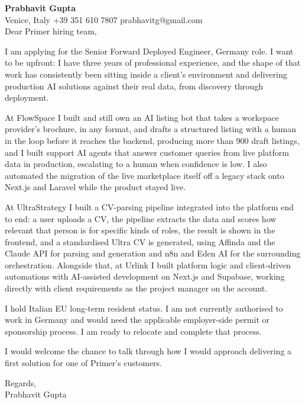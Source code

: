 \documentclass[a4paper,10.5pt]{article}
\begin{document}
\textbf{Prabhavit Gupta}\\
Venice, Italy \textbar{} +39 351 610 7807 \textbar{} prabhavitg@gmail.com\\[10pt]
Dear Primer hiring team,

I am applying for the Senior Forward Deployed Engineer, Germany role. I want to be upfront: I have three years of professional experience, and the shape of that work has consistently been sitting inside a client's environment and delivering production AI solutions against their real data, from discovery through deployment.

At FlowSpace I built and still own an AI listing bot that takes a workspace provider's brochure, in any format, and drafts a structured listing with a human in the loop before it reaches the backend, producing more than 900 draft listings, and I built support AI agents that answer customer queries from live platform data in production, escalating to a human when confidence is low. I also automated the migration of the live marketplace itself off a legacy stack onto Next.js and Laravel while the product stayed live.

At UltraStrategy I built a CV-parsing pipeline integrated into the platform end to end: a user uploads a CV, the pipeline extracts the data and scores how relevant that person is for specific kinds of roles, the result is shown in the frontend, and a standardised Ultra CV is generated, using Affinda and the Claude API for parsing and generation and n8n and Eden AI for the surrounding orchestration. Alongside that, at Urlink I built platform logic and client-driven automations with AI-assisted development on Next.js and Supabase, working directly with client requirements as the project manager on the account.

I hold Italian EU long-term resident status. I am not currently authorised to work in Germany and would need the applicable employer-side permit or sponsorship process. I am ready to relocate and complete that process.

I would welcome the chance to talk through how I would approach delivering a first solution for one of Primer's customers.

Regards,\\
Prabhavit Gupta
\end{document}
